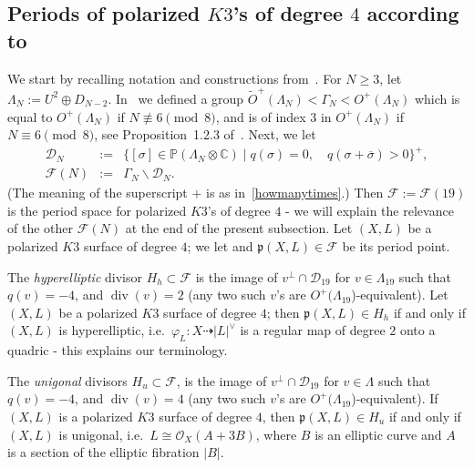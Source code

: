 \documentclass[11pt]{amsart}
\numberwithin{equation}{section}
\theoremstyle{plain}
\theoremstyle{remark}
\theoremstyle{definition}
\newcommand{\cF}{\mathscr{F}}
\newcommand{\gp}{\mathfrak{p}}
\newcommand{\CC}{{\mathbb C}}
\newcommand{\cD}{{\mathscr D}}
\newcommand{\cO}{{\mathscr O}}
\newcommand{\dra}{\dashrightarrow}
\newcommand{\ov}{\overline}
\newcommand{\PP}{{\mathbb P}}
\newcommand{\wt}{\widetilde}
\DeclareMathOperator{\divisore}{div}
\begin{document}
\subsection{Periods of polarized $K3$'s of degree $4$ according  to~\cite{log1}} \label{subsec:predictq}
%
We start by recalling notation and constructions from~\cite{log1}.   For $N\ge 3$, let $\Lambda_N:=U^2\oplus D_{N-2}$. In~\cite{log1} we defined a group $\wt{O}^{+}(\Lambda_N)<\Gamma_N< O^{+}(\Lambda_N)$ which is equal to $O^{+}(\Lambda_N)$ if $N\not\equiv 6\pmod{8}$,  and is of index $3$ in  $O^{+}(\Lambda_N)$ if $N\equiv 6\pmod{8}$, see
Proposition~1.2.3 of~\cite{log1}. Next, we let
%
\begin{eqnarray}\label{ancora}
%
\cD_N & := & \{[\sigma]\in\PP(\Lambda_{N}\otimes\CC) \mid q(\sigma)=0,\quad q(\sigma+\ov{\sigma})>0\}^{+},\\
%
\cF(N)  & := & \Gamma_N\backslash \cD_N.
%
\end{eqnarray}
%
(The meaning of the superscript $+$ is as in~\eqref{howmanytimes}.) Then $\cF:=\cF(19)$ is the period space for polarized $K3$'s of degree $4$ - we will explain the relevance of the other $\cF(N)$ at the end of the present subsection. Let  $(X,L)$ be a polarized $K3$ surface of degree $4$; we let and $\gp(X,L)\in\cF$ be its period point.

The \emph{hyperelliptic}   divisor $H_h\subset\cF$ is  the image  of $v^{\bot}\cap\cD_{19}$ for $v\in\Lambda_{19}$ such that $q(v)=-4$, and $\divisore(v)=2$  
(any two such $v$'s are $O^{+}(\Lambda_{19}$)-equivalent).  Let  $(X,L)$ be a polarized $K3$ surface of degree $4$;  then $\gp(X,L)\in H_h$ if and only if $(X,L)$ is hyperelliptic, i.e.~$\varphi_L\colon X\dra |L|^{\vee}$ is  a regular map of degree $2$ onto a quadric - this explains our terminology. 

 The  \emph{unigonal}  divisors   $H_u\subset \cF$,  is  the image  of $v^{\bot}\cap\cD_{19}$ for $v\in\Lambda$ such that $q(v)=-4$, and $\divisore(v)=4$ (any two such $v$'s are $O^{+}(\Lambda_{19}$)-equivalent). 
 If  $(X,L)$ is a polarized $K3$ surface of degree $4$,  then  $\gp(X,L)\in H_u$ if and only if $(X,L)$ is unigonal, i.e.~$L\cong \cO_X(A+3B)$, where $B$ is an elliptic curve and $A$ is a section of the elliptic fibration $|B|$. 
 
\end{document}
